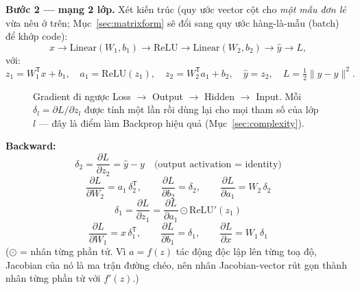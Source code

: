 \documentclass[12pt,a4paper]{article}
\newcommand{\T}{^{\mathsf{T}}}
\begin{document}
\textbf{Bước 2 --- mạng 2 lớp.} Xét kiến trúc (quy ước vector cột cho
\emph{một mẫu đơn lẻ} vừa nêu ở trên; Mục~\ref{sec:matrixform}
sẽ đổi sang quy ước hàng-là-mẫu (batch) để khớp code):
$$x \to \mathrm{Linear}(W_1,b_1) \to \mathrm{ReLU} \to \mathrm{Linear}(W_2,b_2)
\to \hat y \to L,$$
với:
$$z_1 = W_1\T x + b_1,\quad a_1=\mathrm{ReLU}(z_1),\quad
z_2 = W_2\T a_1+b_2,\quad \hat y = z_2,\quad L=\tfrac12\lVert \hat y-y\rVert^2.$$

\begin{figure}[htbp]
\centering
{}
\caption{Gradient đi ngược Loss $\to$ Output $\to$ Hidden $\to$ Input. Mỗi
$\delta_l=\partial L/\partial z_l$ được tính một lần rồi dùng lại cho mọi
tham số của lớp $l$ --- đây là điểm làm Backprop hiệu quả (Mục~\ref{sec:complexity}).}
\label{fig:2layerflow}
\end{figure}

\textbf{Backward:}
$$\delta_2=\frac{\partial L}{\partial z_2}=\hat y-y \quad\text{(output activation = identity)}$$
$$\frac{\partial L}{\partial W_2}=a_1\,\delta_2\T,\qquad
\frac{\partial L}{\partial b_2}=\delta_2,\qquad
\frac{\partial L}{\partial a_1}=W_2\,\delta_2$$
$$\delta_1=\frac{\partial L}{\partial z_1}=\frac{\partial L}{\partial a_1}\odot \mathrm{ReLU}'(z_1)$$
$$\frac{\partial L}{\partial W_1}=x\,\delta_1\T,\qquad
\frac{\partial L}{\partial b_1}=\delta_1,\qquad
\frac{\partial L}{\partial x}=W_1\,\delta_1$$
($\odot$ = nhân từng phần tử. Vì $a=f(z)$ tác động độc lập lên từng toạ độ,
Jacobian của nó là ma trận đường chéo, nên nhân Jacobian-vector rút gọn
thành nhân từng phần tử với $f'(z)$.)
\end{document}
